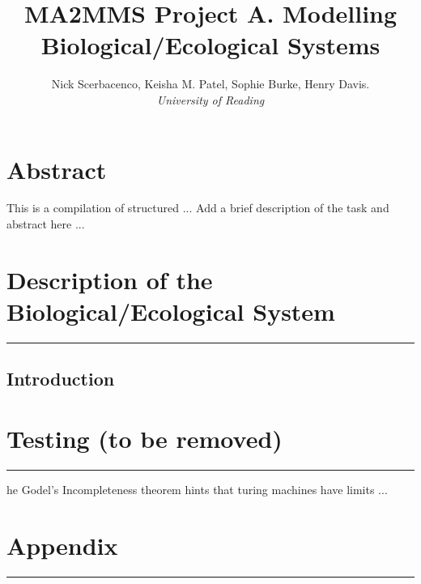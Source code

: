 \documentclass[11pt]{article}
\title{\textbf{MA2MMS Project A. Modelling Biological/Ecological Systems}}
\author{Nick Scerbacenco, Keisha M. Patel, Sophie Burke, Henry Davis. \\
        \textit{University of Reading}}
\date{ }
\begin{document}
\pagestyle{fancy}


\maketitle
\thispagestyle{empty} 

\section*{\textbf{Abstract}}
This is a compilation of structured ... Add a brief description of the task and abstract here ...

\tableofcontents

\newpage


\section{Description of the Biological/Ecological System}
\hrule height 0.8pt 
\vspace{5mm}

\subsection{Introduction}


\newpage
\section{Testing (to be removed)}
\hrule height 0.8pt 
\vspace{5mm}

\lettrine[findent=2pt]{}{ } he Godel's Incompleteness theorem hints that turing machines have limits ...


\newpage 
\section*{Appendix}
\hrule height 0.8pt 
\vspace{5mm}



\end{document}
